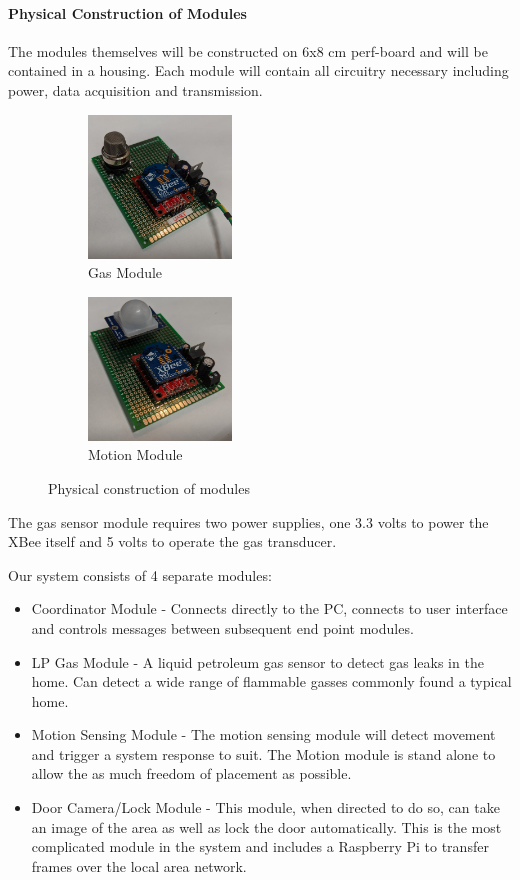 \documentclass[a4paper,11pt]{report}
\begin{document}
			\newpage
			\paragraph{\normalsize Physical Construction of Modules} The modules themselves will be constructed on 6x8 cm perf-board and will be contained in a housing. Each module will contain all circuitry necessary including power, data acquisition and transmission. 
			\begin{figure}[h!]
				\centering
				\begin{subfigure}[t]{0.45\textwidth}
					\centering
					\includegraphics[height=1.5in]{module_gas.jpg}
					\caption{Gas Module}
				\end{subfigure}
				\begin{subfigure}[t]{0.45\textwidth}
					\centering
					\includegraphics[height=1.5in]{module_motion.jpg}
					\caption{Motion Module}
				\end{subfigure}
				\caption{Physical construction of modules}
			\end{figure}
			\par The gas sensor module requires two power supplies, one 3.3 volts to power the XBee itself and 5 volts to operate the gas transducer. \\
			\par Our system consists of 4 separate modules:
			\begin{itemize}
				\item Coordinator Module - Connects directly to the PC, connects to user interface and controls messages between subsequent end point modules. 
				\item LP Gas Module - A liquid petroleum gas sensor to detect gas leaks in the home. Can detect a wide range of flammable gasses commonly found a typical home.
				\item Motion Sensing Module - The motion sensing module will detect movement and trigger a system response to suit. The Motion module is stand alone to allow the as much freedom of placement as possible.
				\item Door Camera/Lock Module - This module, when directed to do so, can take an image of the area as well as lock the door automatically. This is the most complicated module in the system and includes a Raspberry Pi to transfer frames over the local area network.
			\end{itemize}
		\newpage
\end{document}
